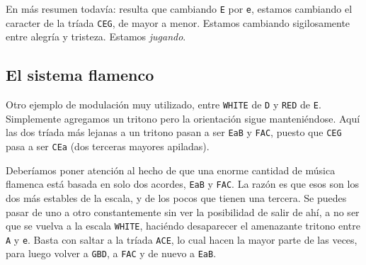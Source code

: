 \documentclass[]{report}
\begin{document}
En más resumen todavía: resulta que cambiando \texttt{E} por \texttt{e}, estamos cambiando el caracter de la tríada \texttt{CEG}, de mayor a menor. Estamos cambiando sigilosamente entre alegría y tristeza. Estamos \emph{jugando}.

\subsection{El sistema flamenco}
Otro ejemplo de modulación muy utilizado, entre \texttt{WHITE} de \texttt{D} y \texttt{RED} de \texttt{E}. Simplemente agregamos un tritono pero la orientación sigue manteniéndose. Aquí las dos tríada más lejanas a un tritono pasan a ser \texttt{EaB} y \texttt{FAC}, puesto que \texttt{CEG} pasa a ser \texttt{CEa} (dos terceras mayores apiladas).

Deberíamos poner atención al hecho de que una enorme cantidad de música flamenca está basada en solo dos acordes, \texttt{EaB} y \texttt{FAC}. La razón es que esos son los dos más estables de la escala, y de los pocos que tienen una tercera. Se puedes pasar de uno a otro constantemente sin ver la posibilidad de salir de ahí, a no ser que se vuelva a la escala \texttt{WHITE}, haciéndo desaparecer el amenazante tritono entre \texttt{A} y \texttt{e}. Basta con saltar a la tríada \texttt{ACE}, lo cual hacen la mayor parte de las veces, para luego volver a \texttt{GBD}, a \texttt{FAC} y de nuevo a \texttt{EaB}.
\end{document}
